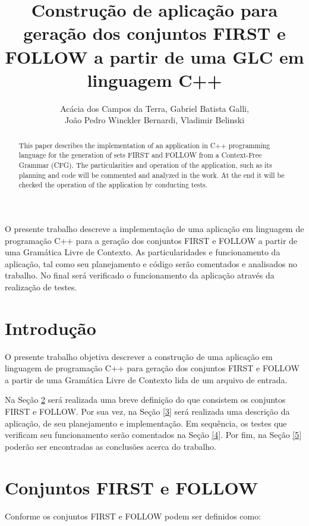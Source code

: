 \documentclass[12pt]{article}
\title{Construção de aplicação para geração dos conjuntos FIRST e FOLLOW a partir de uma GLC em linguagem C++}
\author{Acácia dos Campos da Terra\inst{1}, Gabriel Batista Galli\inst{1},\\ João Pedro Winckler Bernardi\inst{1}, Vladimir Belinski\inst{1} }
\theoremstyle{definition}
\begin{document}
 

\maketitle

\begin{abstract}
 This paper describes the implementation of an application in C++ programming language for the generation of sets FIRST and FOLLOW from a Context-Free Grammar (CFG). The particularities and operation of the application, such as its planning and code will be commented and analyzed in the work. At the end it will be checked the operation of the application by conducting tests.
\end{abstract}
     
\begin{resumo} 
 O presente trabalho descreve a implementação de uma aplicação em linguagem de programação C++ para a geração dos conjuntos FIRST e FOLLOW a partir de uma Gramática Livre de Contexto. As particularidades e funcionamento da aplicação, tal como seu planejamento e código serão comentados e analisados no trabalho. No final será verificado o funcionamento da aplicação através da realização de testes.

\end{resumo}


\section{Introdução}

O presente trabalho objetiva descrever a construção de uma aplicação em linguagem de programação C++ para geração dos conjuntos FIRST e FOLLOW a partir de uma Gramática Livre de Contexto lida de um arquivo de entrada.

Na Seção \ref{2} será realizada uma breve definição do que consistem os conjuntos FIRST  e FOLLOW. Por sua vez, na Seção \ref{3} será realizada uma descrição da aplicação, de seu planejamento e implementação. Em sequência, os testes que verificam seu funcionamento serão comentados na Seção \ref{4}. Por fim, na Seção \ref{5} poderão ser encontradas as conclusões acerca do trabalho.

\section{Conjuntos FIRST e FOLLOW}
\label{2}

Conforme \cite{furtado} os conjuntos FIRST e FOLLOW podem ser definidos como:\newline
\end{document}

